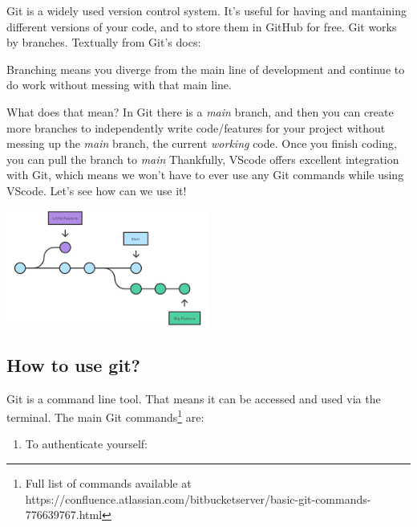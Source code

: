 \documentclass[
  paper=a4,
  ,captions=tableheading
]{scrbook}
\providecommand{\tightlist}{%
  \setlength{\itemsep}{0pt}\setlength{\parskip}{0pt}}
\let\origfigure\figure
\let\endorigfigure\endfigure
\renewenvironment{figure}[1][2] {
    \expandafter\origfigure\expandafter[H]
} {
    \endorigfigure
}
\renewenvironment{quote}{\begin{customblockquote}\list{}{\rightmargin=0em\leftmargin=0em}%
\item\relax\color{blockquote-text}\ignorespaces}{\unskip\unskip\endlist\end{customblockquote}}
\begin{document}
Git is a widely used version control system. It's useful for having and
mantaining different versions of your code, and to store them in GitHub
for free. Git works by branches. Textually from Git's docs:

\begin{quote}
Branching means you diverge from the main line of development and
continue to do work without messing with that main line.
\end{quote}

What does that mean? In Git there is a \emph{main} branch, and then you
can create more branches to independently write code/features for your
project without messing up the \emph{main} branch, the current
\emph{working} code. Once you finish coding, you can pull the branch to
\emph{main} Thankfully, VScode offers excellent integration with Git,
which means we won't have to ever use any Git commands while using
VScode. Let's see how can we use it!

\begin{figure}
\centering
\includegraphics[width=0.5\textwidth,height=\textheight]{./tex2pdf.-45885137cafe410a/7f052acda8c69b8ef1156d1d65b0c0e1538337f6.png}
\caption{An example of a Git repository with its \emph{main}, \emph{big
feature} and \emph{little feature} branches.}
\end{figure}

\hypertarget{how-to-use-git}{%
\subsection{How to use git?}\label{how-to-use-git}}

Git is a command line tool. That means it can be accessed and used via
the terminal. The main Git
commands\footnote{Full list of commands available at https://confluence.atlassian.com/bitbucketserver/basic-git-commands-776639767.html}
are:

\begin{enumerate}
\def\labelenumi{\arabic{enumi}.}
\tightlist
\item
  To authenticate yourself:
\end{enumerate}
\end{document}
